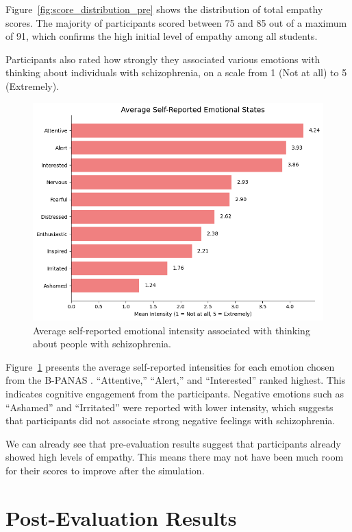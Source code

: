 Figure~\ref{fig:score_distribution_pre} shows the distribution of total empathy scores. The majority of participants scored between 75 and 85 out of a maximum of 91, which confirms the high initial level of empathy among all students.

\vspace{1em}

Participants also rated how strongly they associated various emotions with thinking about individuals with schizophrenia, on a scale from 1 (Not at all) to 5 (Extremely).

\begin{figure}[htbp]
    \centering
    \includegraphics[width=0.7\columnwidth]{../../Figures/avg-emotions-pre.png}
    \caption{Average self-reported emotional intensity associated with thinking about people with schizophrenia.}
    \label{fig:avg_emotions_pre}
\end{figure}

Figure~\ref{fig:avg_emotions_pre} presents the average self-reported intensities for each emotion chosen from the B-PANAS \cite{Boiroux2024}. “Attentive,” “Alert,” and “Interested” ranked highest. This indicates cognitive engagement from the participants. Negative emotions such as “Ashamed” and “Irritated” were reported with lower intensity, which suggests that participants did not associate strong negative feelings with schizophrenia. 

\vspace{1em}

We can already see that pre-evaluation results suggest that participants already showed high levels of empathy. This means there may not have been much room for their scores to improve after the simulation.

\section{Post-Evaluation Results}

